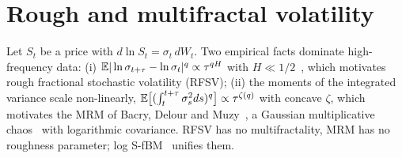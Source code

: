 \documentclass[10pt,twocolumn]{article}
\begin{document}
\maketitle

\begin{abstract}
\noindent Empirical volatility is \emph{rough}: its logarithm behaves like a fractional Brownian motion with Hurst exponent $H\approx0.1$ or smaller. Multifractal random measures (MRM) describe the limit $H\to0$ but have no roughness parameter. The log stationary fractional Brownian motion (log S-fBM) contains both. We state its construction, prove that its covariance is admissible, show that it converges to the log-normal MRM as $H\to0$ at fixed intermittency, derive exact second-order moments of the integrated variance and of its logarithm, and explain why a generalised method of moments (GMM) built on these moments avoids the upward bias of scaling-based estimators of $H$.
\end{abstract}

\section{Rough and multifractal volatility}
Let $S_t$ be a price with $d\ln S_t=\sigma_t\,dW_t$. Two empirical facts dominate high-frequency data: (i) $\mathbb{E}|\ln\sigma_{t+\tau}-\ln\sigma_t|^q\propto\tau^{qH}$ with $H\ll1/2$~\cite{gatheral2018}, which motivates rough fractional stochastic volatility (RFSV); (ii) the moments of the integrated variance scale non-linearly, $\mathbb{E}\big[(\int_t^{t+\tau}\sigma_s^2ds)^q\big]\propto\tau^{\zeta(q)}$ with concave $\zeta$, which motivates the MRM of Bacry, Delour and Muzy~\cite{bacry2001}, a Gaussian multiplicative chaos~\cite{kahane1985} with logarithmic covariance. RFSV has no multifractality, MRM has no roughness parameter; log S-fBM~\cite{wu2022} unifies them.
\end{document}
